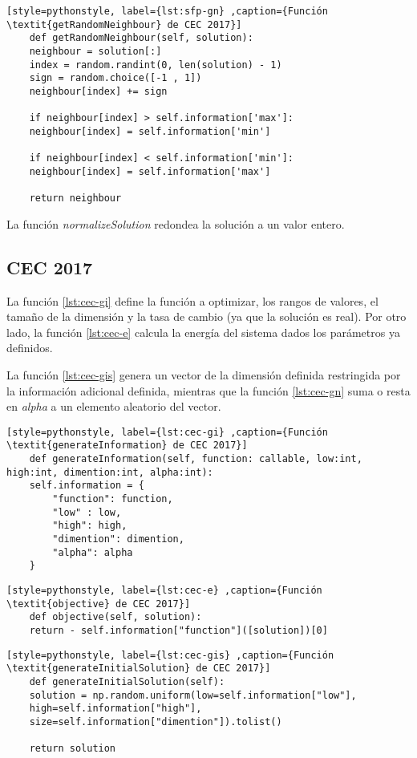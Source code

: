\begin{lstlisting}[style=pythonstyle, label={lst:sfp-gn} ,caption={Función \textit{getRandomNeighbour} de CEC 2017}]
	def getRandomNeighbour(self, solution):
	neighbour = solution[:]
	index = random.randint(0, len(solution) - 1)
	sign = random.choice([-1 , 1])
	neighbour[index] += sign
	
	if neighbour[index] > self.information['max']:
	neighbour[index] = self.information['min']
	
	if neighbour[index] < self.information['min']:
	neighbour[index] = self.information['max']
	
	return neighbour
\end{lstlisting}

La función \textit{normalizeSolution} redondea la solución a un valor entero.

\subsection{CEC 2017}

La función \ref{lst:cec-gi} define la función a optimizar, los rangos de valores, el tamaño de la dimensión y la tasa de cambio (ya que la solución es real). Por otro lado, la función \ref{lst:cec-e} calcula la energía del sistema dados los parámetros ya definidos.

La función \ref{lst:cec-gis} genera un vector de la dimensión definida restringida por la información adicional definida, mientras que la función \ref{lst:cec-gn} suma  o resta en \textit{alpha} a un elemento aleatorio del vector.

\begin{lstlisting}[style=pythonstyle, label={lst:cec-gi} ,caption={Función \textit{generateInformation} de CEC 2017}]
	def generateInformation(self, function: callable, low:int, high:int, dimention:int, alpha:int):
	self.information = {
		"function": function,
		"low" : low,
		"high": high,
		"dimention": dimention,
		"alpha": alpha
	}
\end{lstlisting}

\begin{lstlisting}[style=pythonstyle, label={lst:cec-e} ,caption={Función \textit{objective} de CEC 2017}]
	def objective(self, solution):
	return - self.information["function"]([solution])[0]
\end{lstlisting}

\begin{lstlisting}[style=pythonstyle, label={lst:cec-gis} ,caption={Función \textit{generateInitialSolution} de CEC 2017}]
	def generateInitialSolution(self):
	solution = np.random.uniform(low=self.information["low"],
	high=self.information["high"],
	size=self.information["dimention"]).tolist()
	
	return solution
\end{lstlisting}

